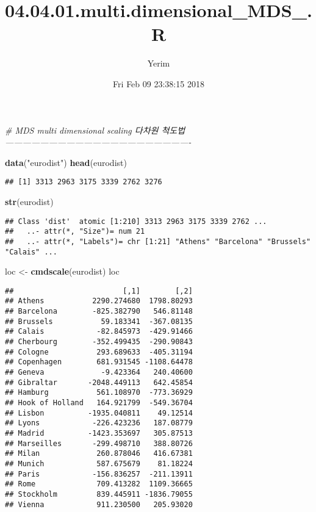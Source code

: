 \documentclass[]{article}
\title{04.04.01.multi.dimensional\_MDS\_.R}
\author{Yerim}
\date{Fri Feb 09 23:38:15 2018}
\newenvironment{Shaded}{\begin{snugshade}}{\end{snugshade}}
\newcommand{\KeywordTok}[1]{\textcolor[rgb]{0.13,0.29,0.53}{\textbf{#1}}}
\newcommand{\StringTok}[1]{\textcolor[rgb]{0.31,0.60,0.02}{#1}}
\newcommand{\CommentTok}[1]{\textcolor[rgb]{0.56,0.35,0.01}{\textit{#1}}}
\newcommand{\NormalTok}[1]{#1}
\begin{document}
\maketitle

\begin{Shaded}
\begin{Highlighting}[]
\CommentTok{# MDS multi dimensional scaling 다차원 척도법----------------------------------------------------------------}


\KeywordTok{data}\NormalTok{(}\StringTok{"eurodist"}\NormalTok{)}
\KeywordTok{head}\NormalTok{(eurodist)}
\end{Highlighting}
\end{Shaded}

\begin{verbatim}
## [1] 3313 2963 3175 3339 2762 3276
\end{verbatim}

\begin{Shaded}
\begin{Highlighting}[]
\KeywordTok{str}\NormalTok{(eurodist)}
\end{Highlighting}
\end{Shaded}

\begin{verbatim}
## Class 'dist'  atomic [1:210] 3313 2963 3175 3339 2762 ...
##   ..- attr(*, "Size")= num 21
##   ..- attr(*, "Labels")= chr [1:21] "Athens" "Barcelona" "Brussels" "Calais" ...
\end{verbatim}

\begin{Shaded}
\begin{Highlighting}[]
\NormalTok{loc <-}\StringTok{ }\KeywordTok{cmdscale}\NormalTok{(eurodist)}
\NormalTok{loc}
\end{Highlighting}
\end{Shaded}

\begin{verbatim}
##                         [,1]        [,2]
## Athens           2290.274680  1798.80293
## Barcelona        -825.382790   546.81148
## Brussels           59.183341  -367.08135
## Calais            -82.845973  -429.91466
## Cherbourg        -352.499435  -290.90843
## Cologne           293.689633  -405.31194
## Copenhagen        681.931545 -1108.64478
## Geneva             -9.423364   240.40600
## Gibraltar       -2048.449113   642.45854
## Hamburg           561.108970  -773.36929
## Hook of Holland   164.921799  -549.36704
## Lisbon          -1935.040811    49.12514
## Lyons            -226.423236   187.08779
## Madrid          -1423.353697   305.87513
## Marseilles       -299.498710   388.80726
## Milan             260.878046   416.67381
## Munich            587.675679    81.18224
## Paris            -156.836257  -211.13911
## Rome              709.413282  1109.36665
## Stockholm         839.445911 -1836.79055
## Vienna            911.230500   205.93020
\end{verbatim}
\end{document}

